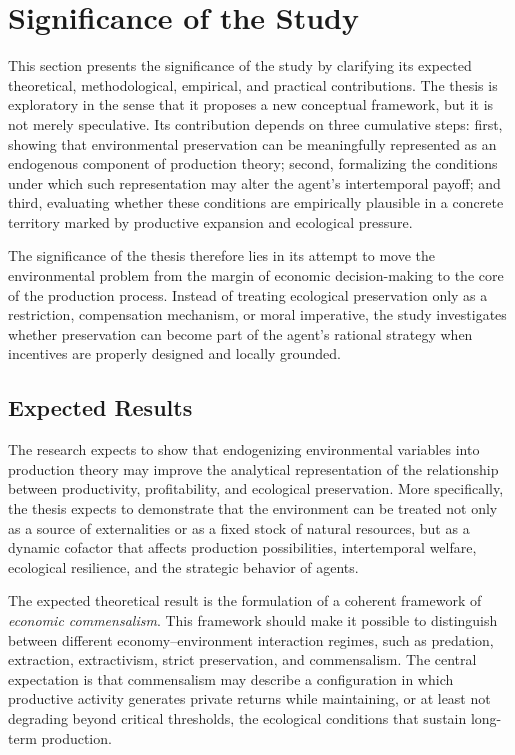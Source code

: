 
\section{Significance of the Study}

This section presents the significance of the study by clarifying its expected theoretical, methodological, empirical, and practical contributions. The thesis is exploratory in the sense that it proposes a new conceptual framework, but it is not merely speculative. Its contribution depends on three cumulative steps: first, showing that environmental preservation can be meaningfully represented as an endogenous component of production theory; second, formalizing the conditions under which such representation may alter the agent's intertemporal payoff; and third, evaluating whether these conditions are empirically plausible in a concrete territory marked by productive expansion and ecological pressure.

The significance of the thesis therefore lies in its attempt to move the environmental problem from the margin of economic decision-making to the core of the production process. Instead of treating ecological preservation only as a restriction, compensation mechanism, or moral imperative, the study investigates whether preservation can become part of the agent's rational strategy when incentives are properly designed and locally grounded.

\subsection{Expected Results}

The research expects to show that endogenizing environmental variables into production theory may improve the analytical representation of the relationship between productivity, profitability, and ecological preservation. More specifically, the thesis expects to demonstrate that the environment can be treated not only as a source of externalities or as a fixed stock of natural resources, but as a dynamic cofactor that affects production possibilities, intertemporal welfare, ecological resilience, and the strategic behavior of agents.

The expected theoretical result is the formulation of a coherent framework of \emph{economic commensalism}. This framework should make it possible to distinguish between different economy--environment interaction regimes, such as predation, extraction, extractivism, strict preservation, and commensalism. The central expectation is that commensalism may describe a configuration in which productive activity generates private returns while maintaining, or at least not degrading beyond critical thresholds, the ecological conditions that sustain long-term production.

